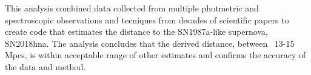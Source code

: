This analysis combined data collected from multiple photmetric and spectroscopic observations and tecniques 
from decades of scientific papers to create code that estimates the distance to the SN1987a-like supernova, 
SN2018hna. The analysis concludes that the derived distance, between ~13-15 Mpcs, is within acceptable range 
of other estimates and confirms the accuracy of the data and method.
